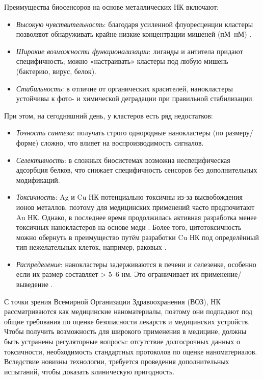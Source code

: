 \documentclass[a4paper,12pt]{article}
\begin{document}
\begin{onehalfspace}
	Преимущества биосенсоров на основе металлических НК включают:
	\begin{itemize}
		\item \textit{Высокую чувствительность}: благодаря усиленной флуоресценции кластеры позволяют обнаруживать крайне низкие концентрации мишеней (пМ–нМ) \cite{Romeo2021, Han2025}.
		\item \textit{Широкие возможности функционализации}: лиганды и антитела придают специфичность; можно «настраивать» кластеры под любую мишень (бактерию, вирус, белок).
		\item \textit{Стабильность}: в отличие от органических красителей, нанокластеры устойчивы к фото- и химической деградации при правильной стабилизации.
	\end{itemize}
	
	При этом, на сегодняшний день, у кластеров есть ряд недостатков:
	\begin{itemize}
		\item \textit{Точность синтеза}: получать строго однородные нанокластеры (по размеру/форме) сложно, что влияет на воспроизводимость сигналов.
		\item \textit{Селективность}: в сложных биосистемах возможна неспецифическая адсорбция белков, что снижает специфичность сенсоров без дополнительных модификаций.
		\item \textit{Токсичность}: Ag и Cu НК потенциально токсичны из-за высвобождения ионов металлов, поэтому для медицинских применений часто предпочитают Au НК. Однако, в последнее время продолжилась активная разработка менее токсичных нанокластеров на основе меди \cite{Babu2022}. Более того, цитотоксичность можно обернуть в преимущество путём разработки Cu НК под определённый тип нежелательных клеток, например, раковых  \cite{Haiguang2026, Sijia2024}.
		\item \textit{Распределение}: нанокластеры задерживаются в печени и селезенке, особенно если их размер составляет > 5–6 нм. Это ограничивает их применение/выведение \cite{Hejazy2018}.
	\end{itemize}
	
	С точки зрения Всемирной Организации Здравоохранения (ВОЗ), НК рассматриваются как медицинские наноматериалы, поэтому они подпадают под общие требования по оценке безопасности лекарств и медицинских устройств. Чтобы получить возможность для широкого применения в медицине, должны быть устранены регуляторные вопросы: отсутствие долгосрочных данных о токсичности, необходимость стандартных протоколов по	оценке наноматериалов. Вследствие новизны технологии, требуется проведения дополнительных испытаний, чтобы доказать клиническую пригодность. 
	

\end{onehalfspace}
\end{document}

